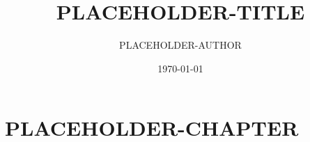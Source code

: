 \documentclass{lecturenotes}
\title{PLACEHOLDER-TITLE}
\author{PLACEHOLDER-AUTHOR}
\date{\today}
\begin{document}
\maketitle
\newpage
\tableofcontents
\newpage

\chapter{PLACEHOLDER-CHAPTER}
\localtableofcontents
\end{document}

